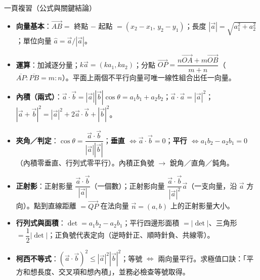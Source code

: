 \documentclass[11pt]{article}
\begin{document}
\begin{補充框}{一頁複習（公式與關鍵結論）}
\begin{itemize}\setlength{\itemsep}{2pt}
\item \textbf{向量基本}：$\overrightarrow{AB}=$ 終點 $-$ 起點 $=(x_2-x_1,\,y_2-y_1)$；長度 $|\vec a|=\sqrt{a_1^2+a_2^2}$；單位向量 $\hat a=\vec a/|\vec a|$。
\item \textbf{運算}：加減逐分量；$k\vec a=(ka_1,ka_2)$；分點 $\overrightarrow{OP}=\dfrac{n\overrightarrow{OA}+m\overrightarrow{OB}}{m+n}$（$\overline{AP}:\overline{PB}=m:n$）。平面上兩個不平行向量可唯一線性組合出任一向量。
\item \textbf{內積（兩式）}：$\vec a\cdot\vec b=|\vec a||\vec b|\cos\theta=a_1b_1+a_2b_2$；$\vec a\cdot\vec a=|\vec a|^2$；$|\vec a+\vec b|^2=|\vec a|^2+2\vec a\cdot\vec b+|\vec b|^2$。
\item \textbf{夾角／判定}：$\cos\theta=\dfrac{\vec a\cdot\vec b}{|\vec a||\vec b|}$；\textbf{垂直 $\iff\vec a\cdot\vec b=0$}；\textbf{平行 $\iff a_1b_2-a_2b_1=0$}（內積零垂直、行列式零平行）。內積正負號 $\to$ 銳角／直角／鈍角。
\item \textbf{正射影}：正射影量 $\dfrac{\vec a\cdot\vec b}{|\vec a|}$（一個數）；正射影向量 $\dfrac{\vec a\cdot\vec b}{|\vec a|^2}\vec a$（一支向量，沿 $\vec a$ 方向）。點到直線距離 $=\overrightarrow{QP}$ 在法向量 $\vec n=(a,b)$ 上的正射影量大小。
\item \textbf{行列式與面積}：$\det=a_1b_2-a_2b_1$；平行四邊形面積 $=|\det|$、三角形 $=\dfrac12|\det|$；正負號代表定向（逆時針正、順時針負、共線零）。
\item \textbf{柯西不等式}：$(\vec a\cdot\vec b)^2\le|\vec a|^2|\vec b|^2$；等號 $\iff$ 兩向量平行。求極值口訣：「平方和想長度、交叉項和想內積」，並務必檢查等號取得。
\end{itemize}
\end{補充框}
\end{document}
